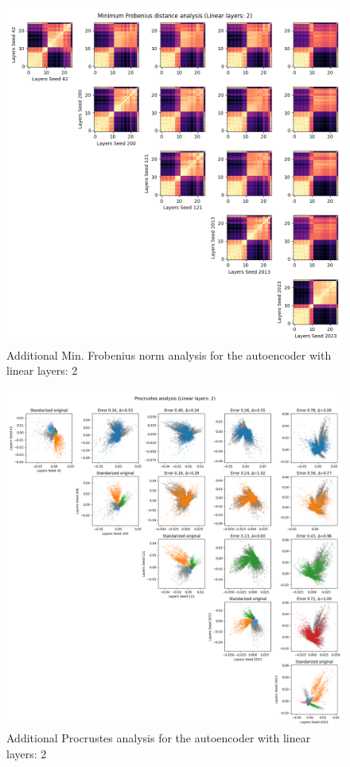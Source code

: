 \documentclass[../main.tex]{subfiles}
\begin{document}
\begin{figure}[ht!]
    \centering
    \includegraphics[width=\textwidth]{figures/rs/sim_ae/frob_2__42_200_121_2013_2023.png}
    \caption{Additional Min. Frobenius norm analysis for the autoencoder with linear layers: 2}
    \label{fig:extra_frob_ae_2}
\end{figure}
%
\begin{figure}[ht!]
    \centering
    \includegraphics[width=\textwidth]{figures/rs/sim_ae/procrustes_2__42_200_121_2013_2023.png} 
    \caption{Additional Procrustes analysis for the autoencoder with linear layers: 2}
    \label{fig:extra_proc_ae_2}
\end{figure}
\end{document}
